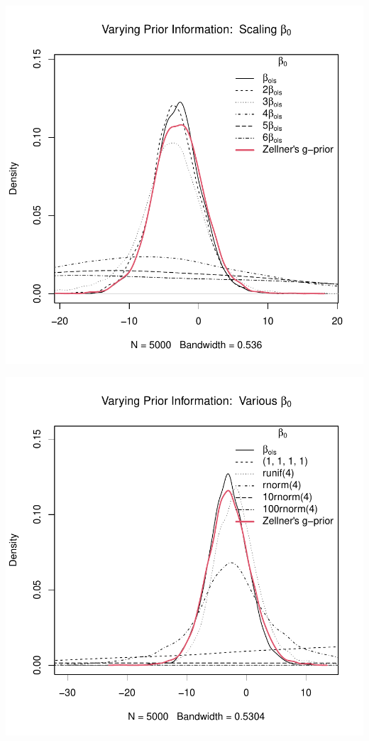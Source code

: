 \documentclass[12pt, a4paper]{article}
\begin{document}
\includegraphics{Thesis-023}

\includegraphics{Thesis-024}
\end{document}
